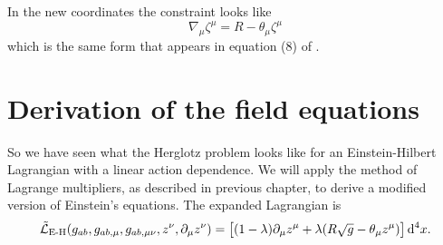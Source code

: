 \documentclass[../main.tex]{subfiles}
\begin{document}
In the new coordinates the constraint looks like 
\begin{equation} \label{eq:constraint coordinates 2}
	\nabla_\mu \zeta^\mu = R - \theta_\mu \zeta^\mu
\end{equation}
which is the same form that appears in equation (8) of \cite{Lazo2017}. 

\section{Derivation of the field equations}
So we have seen what the Herglotz problem looks like for an Einstein-Hilbert Lagrangian
with a linear action dependence. We will apply the method of Lagrange multipliers, as
described in previous chapter, to derive a modified version of Einstein's equations. The
expanded Lagrangian is
\begin{equation*}
	\tilde{\mathcal{L}}_\text{E-H}(g_{ab}, g_{ab,\mu}, g_{ab,\mu\nu}, z^\nu, \partial_\mu z^\nu) =
	\big[(1-\lambda) \partial_\mu z^\mu + \lambda(R\sqrt{g} - \theta_\mu z^\mu)\big] \,\mathrm{d}^4
	x.
\end{equation*}
\end{document}

